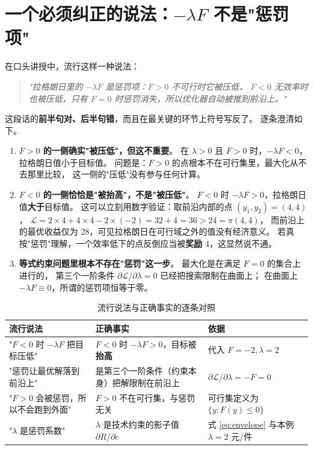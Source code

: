 \section{一个必须纠正的说法：\texorpdfstring{$-\lambda F$}{-lambda F} 不是"惩罚项"}
\label{sec:penalty}

在口头讲授中，流行这样一种说法：

\begin{quote}
\textsl{"拉格朗日里的 $-\lambda F$ 是惩罚项：$F>0$ 不可行时它被压低，
$F<0$ 无效率时也被压低，只有 $F=0$ 时惩罚消失，所以优化器自动被推到前沿上。"}
\end{quote}

这段话的\textbf{前半句对、后半句错}，而且在最关键的环节上符号写反了。
逐条澄清如下。

\begin{enumerate}
  \item \textbf{$F>0$ 的一侧确实"被压低"，但这不重要}。
        在 $\lambda>0$ 且 $F>0$ 时，$-\lambda F<0$，拉格朗日值小于目标值。
        问题是：$F>0$ 的点根本不在可行集里，最大化从不去那里比较，
        这一侧的"压低"没有参与任何计算。
  \item \textbf{$F<0$ 的一侧恰恰是"被抬高"，不是"被压低"}。
        $F<0$ 时 $-\lambda F>0$，拉格朗日值\textbf{大于}目标值。
        这可以立刻用数字验证：取前沿内部的点 $(y_1,y_2)=(4,4)$，
        $\mathcal{L}=2\times 4+4\times 4-2\times(-2)=32+4=36>24=\pi(4,4)$，
        而前沿上的最优收益仅为 $28$，可见拉格朗日在可行域之外的值没有经济意义。
        若真按"惩罚"理解，一个效率低下的点反倒应当被\textbf{奖励} $4$，这显然说不通。
  \item \textbf{等式约束问题里根本不存在"惩罚"这一步}。
        最大化是在满足 $F=0$ 的集合上进行的，
        第三个一阶条件 $\partial\mathcal{L}/\partial\lambda=0$ 已经把搜索限制在曲面上；
        在曲面上 $-\lambda F\equiv 0$，所谓的惩罚项恒等于零。
\end{enumerate}

\begin{table}[H]
\centering
\caption{流行说法与正确事实的逐条对照}
\label{tab:penalty}
\begin{tabular}{p{4.6cm}p{4.6cm}p{4.6cm}}
\toprule
流行说法 & 正确事实 & 依据 \\
\midrule
"$F<0$ 时 $-\lambda F$ 把目标压低" & $F<0$ 时 $-\lambda F>0$，目标被\textbf{抬高} &
代入 $F=-2,\lambda=2$ \\[4pt]
"惩罚让最优解落到前沿上" & 是第三个一阶条件（约束本身）把解限制在前沿上 &
$\partial\mathcal{L}/\partial\lambda=-F=0$ \\[4pt]
"$F>0$ 会被惩罚，所以不会跑到外面" & $F>0$ 不在可行集，与惩罚无关 &
可行集定义为 $\{y:F(y)\le 0\}$ \\[4pt]
"$\lambda$ 是惩罚系数" & $\lambda$ 是技术约束的影子值 $\partial R/\partial c$ &
式 \eqref{eq:envelope} 与本例 $\lambda=2$ 元/件 \\
\bottomrule
\end{tabular}
\end{table}

